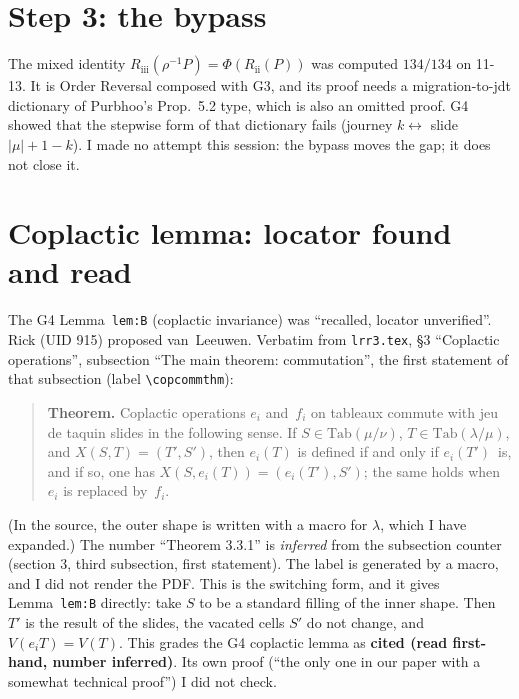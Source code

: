 \documentclass[11pt]{article}
\theoremstyle{definition}
\newcommand{\Rii}{R_{\mathrm{ii}}}
\newcommand{\Riii}{R_{\mathrm{iii}}}
\begin{document}
\section{Step 3: the bypass}
The mixed identity $\Riii(\rho^{-1}P)=\Phi(\Rii(P))$ was computed $134/134$ on 11-13. It is Order Reversal composed with G3, and
its proof needs a migration-to-jdt dictionary of Purbhoo's Prop.~5.2 type, which is also an omitted proof. G4 showed that the
stepwise form of that dictionary fails (journey $k\leftrightarrow$ slide $|\mu|+1-k$). I made no attempt this session: the bypass
moves the gap; it does not close it.

\section{Coplactic lemma: locator found and read}\label{sec:vL}
The G4 Lemma~\texttt{lem:B} (coplactic invariance) was ``recalled, locator unverified''. Rick (UID 915) proposed
van~Leeuwen. Verbatim from \texttt{lrr3.tex}, \S3 ``Coplactic operations'', subsection ``The main theorem: commutation'', the
first statement of that subsection (label \verb|\copcommthm|):
\begin{quote}\small
\textbf{Theorem.} Coplactic operations $e_i$ and~$f_i$ on tableaux commute with jeu de taquin slides in the following sense. If
$S\in\mathrm{Tab}(\mu/\nu)$, $T\in\mathrm{Tab}(\lambda/\mu)$, and $X(S,T)=(T',S')$, then $e_i(T)$ is defined if and only if
$e_i(T')$~is, and if so, one has $X(S,e_i(T))=(e_i(T'),S')$; the same holds when $e_i$ is replaced by~$f_i$.
\end{quote}
(In the source, the outer shape is written with a macro for $\lambda$, which I have expanded.) The number ``Theorem 3.3.1'' is \emph{inferred} from the subsection
counter (section 3, third subsection, first statement). The label is generated by a macro, and I did not render the PDF. This
is the switching form, and it gives Lemma~\texttt{lem:B} directly: take $S$ to be a standard filling of the inner shape. Then $T'$ is
the result of the slides, the vacated cells $S'$ do not change, and $V(e_iT)=V(T)$. This grades the G4 coplactic lemma as \textbf{cited (read first-hand,
number inferred)}. Its own proof (``the only one in our paper with a somewhat technical proof'') I did not check.
\end{document}

